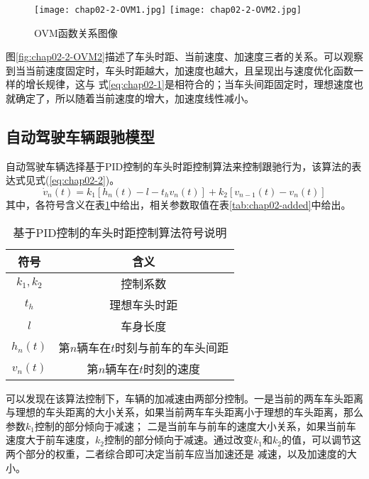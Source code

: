 \begin{figure}
  \centering
    {\texttt{[image: chap02-2-OVM1.jpg]}}
    {\texttt{[image: chap02-2-OVM2.jpg]}}
  \caption{OVM函数关系图像}
  \label{fig:chap02-2-OVM}
\end{figure}

图\ref{fig:chap02-2-OVM2}描述了车头时距、当前速度、加速度三者的关系。可以观察到当当前速度固定时，车头时距越大，加速度也越大，且呈现出与速度优化函数一样的增长规律，这与
式\ref{eq:chap02-1}是相符合的；当车头间距固定时，理想速度也就确定了，所以随着当前速度的增大，加速度线性减小。

\subsection{自动驾驶车辆跟驰模型}

自动驾驶车辆选择基于PID控制的车头时距控制算法来控制跟驰行为，该算法的表达式见式(\ref{eq:chap02-2})。
\begin{equation}
  \dot{v}_n(t) = k_1 \left[ h_n(t) - l - t_hv_n(t) \right] + k_2 \left[ v_{n-1}(t) - v_n(t) \right]
  \label{eq:chap02-2}
\end{equation}
其中，各符号含义在表\ref{tab:chap02-2}中给出，相关参数取值在表\ref{tab:chap02-added}中给出。

\begin{table}
  \centering
  \caption{基于PID控制的车头时距控制算法符号说明}
  \begin{tabular}{cc}
    \toprule
    符号          &  含义                         \\
    \midrule
    $k_1, k_2$            & 控制系数         \\
    $t_h$                 & 理想车头时距             \\
    $l$                   & 车身长度          \\
    $h_n(t)$              & 第$n$辆车在$t$时刻与前车的车头间距        \\
    $v_n(t)$              & 第$n$辆车在$t$时刻的速度 \\
    \bottomrule
  \end{tabular}
  \label{tab:chap02-2}
\end{table}

可以发现在该算法控制下，车辆的加减速由两部分控制。一是当前的两车车头距离与理想的车头距离的大小关系，如果当前两车车头距离小于理想的车头距离，那么参数$k_1$控制的部分倾向于减速；
二是当前车与前车的速度大小关系，如果当前车速度大于前车速度，$k_2$控制的部分倾向于减速。通过改变$k_1$和$k_2$的值，可以调节这两个部分的权重，二者综合即可决定当前车应当加速还是
减速，以及加速度的大小。

